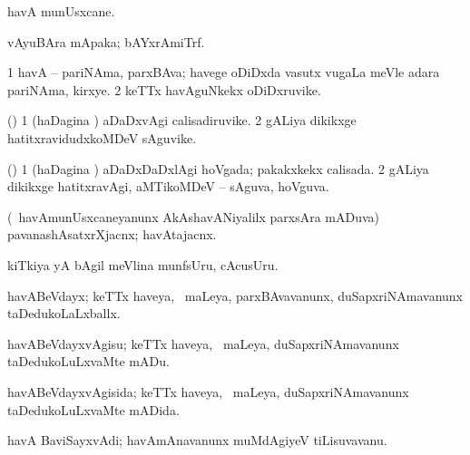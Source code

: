 {\bentry
{} 
\gl{\nA}
\expl{}
\bmng
havA munUsxcane. 
\emng
\eentry

\bentry
{} 
\gl{\nA}
\expl{}
\bmng
vAyuBAra mApaka; bAYxrAmiTrf. 
\emng
\eentry

\bentry
{} 
\gl{\nA}
\expl{}
\bmng
\bnum
\num{1} havA -- pariNAma, parxBAva; havege oDiDxda vasutx \mo vugaLa meVle adara pariNAma, kirxye. 
\num{2} keTTx havAguNkekx oDiDxruvike. 
\enum
\emng
\eentry

\bentry
{} 
\gl{\nA}
\expl{}
\bmng
(\nw) 
\bnum
\num{1} (haDagina \vi) aDaDxvAgi calisadiruvike. 
\num{2} gALiya dikikxge hatitxravidudxkoMDeV sAguvike. 
\enum
\emng
\eentry

\bentry
{} 
\gl{\gu}
\expl{}
\bmng
(\nw) 
\bnum
\num{1} (haDagina \vi) aDaDxDaDxlAgi hoVgada; pakakxkekx calisada. 
\num{2} gALiya dikikxge hatitxravAgi, aMTikoMDeV -- sAguva, hoVguva. 
\enum
\emng
\eentry

\bentry
{} 
\gl{\nA}
\bmng
(\kanmu\ havAmunUsxcaneyanunx AkAshavANiyalilx parxsAra mADuva) pavanashAsatxrXjacnx; havAtajacnx. 
\emng
\eentry

\bentry
{} 
\gl{\nA}
\expl{}
\bmng
{} 
\emng
\eentry

\bentry
{} 
\gl{\nA}
\expl{}
\bmng
kiTkiya yA bAgil meVlina munfsUru, cAcusUru. 
\emng
\eentry

\bentry
{} 
\gl{\gu}
\expl{}
\bmng
havABeVdayx; keTTx haveya, \kanmu\ maLeya, parxBAvavanunx, duSapxriNAmavanunx taDedukoLaLxballx. 
\emng
\eentry

\bentry
{} 
\gl{\sakirx}
\expl{}
\bmng
havABeVdayxvAgisu; keTTx haveya, \kanmu\ maLeya, duSapxriNAmavanunx taDedukoLuLxvaMte mADu. 
\emng
\eentry

\bentry
{} 
\gl{\gu}
\expl{}
\bmng
havABeVdayxvAgisida; keTTx haveya, \kanmu\ maLeya, duSapxriNAmavanunx taDedukoLuLxvaMte mADida. 
\emng
\eentry

\bentry
{} 
\gl{\nA}
\expl{}
\bmng
havA BaviSayxvAdi; havAmAnavanunx muMdAgiyeV tiLisuvavanu. 
\emng
\eentry

}
